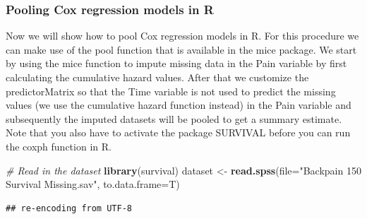 \documentclass[]{book}
\newenvironment{Shaded}{\begin{snugshade}}{\end{snugshade}}
\newcommand{\KeywordTok}[1]{\textcolor[rgb]{0.13,0.29,0.53}{\textbf{#1}}}
\newcommand{\DataTypeTok}[1]{\textcolor[rgb]{0.13,0.29,0.53}{#1}}
\newcommand{\DecValTok}[1]{\textcolor[rgb]{0.00,0.00,0.81}{#1}}
\newcommand{\StringTok}[1]{\textcolor[rgb]{0.31,0.60,0.02}{#1}}
\newcommand{\CommentTok}[1]{\textcolor[rgb]{0.56,0.35,0.01}{\textit{#1}}}
\newcommand{\OperatorTok}[1]{\textcolor[rgb]{0.81,0.36,0.00}{\textbf{#1}}}
\newcommand{\NormalTok}[1]{#1}
\theoremstyle{definition}
\theoremstyle{definition}
\theoremstyle{definition}
\theoremstyle{remark}
\begin{document}
\subsubsection{Pooling Cox regression models in
R}\label{pooling-cox-regression-models-in-r}

Now we will show how to pool Cox regression models in R. For this
procedure we can make use of the pool function that is available in the
mice package. We start by using the mice function to impute missing data
in the Pain variable by first calculating the cumulative hazard values.
After that we customize the predictorMatrix so that the Time variable is
not used to predict the missing values (we use the cumulative hazard
function instead) in the Pain variable and subsequently the imputed
datasets will be pooled to get a summary estimate. Note that you also
have to activate the package SURVIVAL before you can run the coxph
function in R.

\begin{Shaded}
\begin{Highlighting}[]
\CommentTok{# Read in the dataset}
\KeywordTok{library}\NormalTok{(survival)}
\NormalTok{dataset <-}\StringTok{ }\KeywordTok{read.spss}\NormalTok{(}\DataTypeTok{file=}\StringTok{"Backpain 150 Survival Missing.sav"}\NormalTok{, }\DataTypeTok{to.data.frame=}\NormalTok{T)}
\end{Highlighting}
\end{Shaded}

\begin{verbatim}
## re-encoding from UTF-8
\end{verbatim}

\begin{Shaded}
\end{Shaded}
\end{document}
